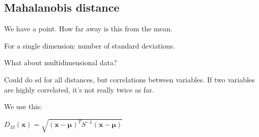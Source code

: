
\subsection{Mahalanobis distance}

We have a point. How far away is this from the mean.

For a single dimension: number of standard deviations.

What about multidimensional data?

Could do sd for all distances, but correlations between variables. If two variables are highly correlated, it's not really twice as far.

We use this:

\(D_M(\mathbf x)=\sqrt {(\mathbf x-\mathbf \mu )^TS^{-1}(\mathbf x-\mathbf \mu )}\)


